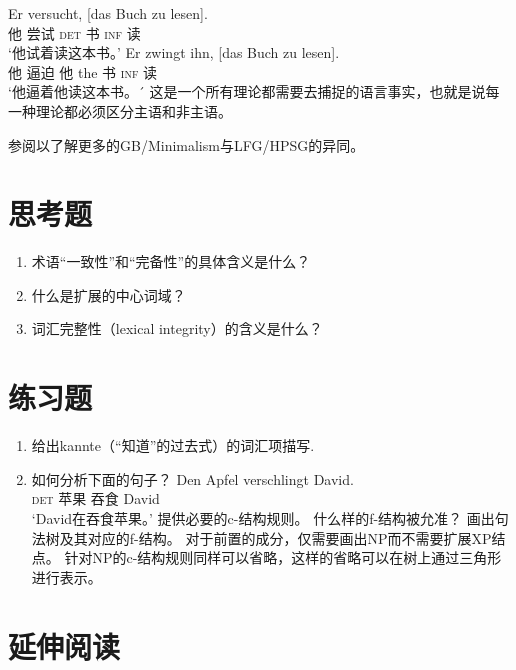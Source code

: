 \eal
\ex 
\gll Er versucht, [das Buch zu lesen].\\
	 他 尝试 \spacebr{}\textsc{det} 书 \textsc{inf} 读\\
\glt `他试着读这本书。'
\ex 
\gll Er zwingt ihn, [das Buch zu lesen].\\
	 他 逼迫 他 \spacebr{}the 书 \textsc{inf} 读\\
\glt `他逼着他读这本书。´
\zl 
这是一个所有理论都需要去捕捉的语言事实，也就是说每一种理论都必须区分主语和非主语。

参阅以了解更多的GB/Minimalism与LFG/HPSG的异同。

\section*{思考题}

\begin{enumerate}
\item 术语“一致性”和“完备性”的具体含义是什么？
\item 什么是扩展的中心词域？
\item 词汇完整性（lexical integrity）的含义是什么？ 
\end{enumerate}

\section*{练习题}

\begin{enumerate}
\item 给出kannte（“知道”的过去式）的词汇项描写.
\item 如何分析下面的句子？
\ea
\gll Den Apfel verschlingt David.\\
	 \textsc{det} 苹果 吞食 David\\
\glt `David在吞食苹果。'
\z
提供必要的c-结构规则。
什么样的f-结构被允准？
画出句法树及其对应的f-结构。
对于前置的成分，仅需要画出NP而不需要扩展XP结点。
针对NP的c-结构规则同样可以省略，这样的省略可以在树上通过三角形进行表示。
\end{enumerate}

\section*{延伸阅读}

